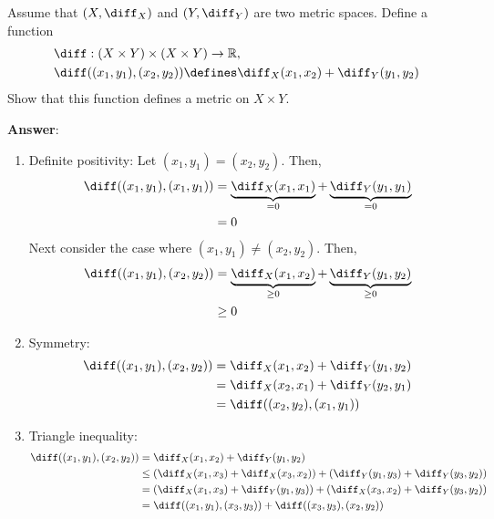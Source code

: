 \begin{exm}
	Assume that $(X,\diff_X)$ and $(Y,\diff_Y)$ are two metric spaces. Define a function
	\begin{align*}
		 & \diff:(X \times Y)\times(X \times Y)\to\mathbb{R},                  \\
		 & \diff((x_1,y_1),(x_2,y_2))\defines\diff_X(x_1,x_2)+\diff_Y(y_1,y_2)
	\end{align*}
	Show that this function defines a metric on $X \times Y$.
	\begin{flushleft}
		\textbf{Answer}:
		\begin{enumerate}
			\item Definite positivity: Let $(x_1,y_1)=(x_2,y_2)$. Then,
			      \begin{align*}
				      \diff((x_1,y_1),(x_1,y_1)) & = \underbrace{\diff_X(x_1,x_1)}_{=0}+\underbrace{\diff_Y(y_1,y_1)}_{=0} \\
				                                 & = 0
			      \end{align*}
			      Next consider the case where $(x_1,y_1)\neq(x_2,y_2)$. Then,
			      \begin{align*}
				      \diff((x_1,y_1),(x_2,y_2)) & = \underbrace{\diff_X(x_1,x_2)}_{\geq0}+\underbrace{\diff_Y(y_1,y_2)}_{\geq0} \\
				                                 & \geq 0
			      \end{align*}
			\item Symmetry:
			      \begin{align*}
				      \diff((x_1,y_1),(x_2,y_2)) & = \diff_X(x_1,x_2) + \diff_Y(y_1,y_2) \\
				                                 & = \diff_X(x_2,x_1) + \diff_Y(y_2,y_1) \\
				                                 & = \diff((x_2,y_2),(x_1,y_1))
			      \end{align*}
			\item Triangle inequality:
			      \begin{align*}
				      \diff((x_1,y_1),(x_2,y_2)) & = \diff_X(x_1,x_2) + \diff_Y(y_1,y_2)                     \\
				                                 & \leq \left(\diff_X(x_1,x_3) + \diff_X(x_3,x_2)\right)
				      +\left(\diff_Y(y_1,y_3)+\diff_Y(y_3,y_2)\right)                                        \\
				                                 & = \left(\diff_X(x_1,x_3)+\diff_Y(y_1,y_3)\right)
				      +\left(\diff_X(x_3,x_2)+\diff_Y(y_3,y_2)\right)                                        \\
				                                 & = \diff((x_1,y_1),(x_3,y_3)) + \diff((x_3,y_3),(x_2,y_2))
			      \end{align*}
		\end{enumerate}
	\end{flushleft}
\end{exm}

